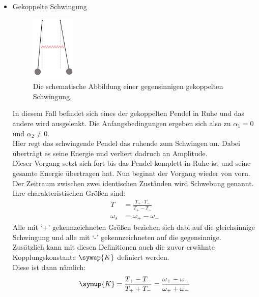 \begin{itemize}
    \item {\Large Gekoppelte Schwingung\\}{
        \begin{figure}[H]
            \centering
            \includegraphics[width=0.2\textwidth]{latex/images/schwing3.PNG}
            \caption{Die schematische Abbildung einer gegensinnigen gekoppelten Schwingung\protect \cite{V106}.}
            \label{img:3}
        \end{figure}
        \noindent In diesem Fall befindet sich eines der gekoppelten Pendel in Ruhe und das andere wird ausgelenkt.
        Die Anfangsbedingungen ergeben sich also zu $\alpha_1=0$ und $\alpha_2 \neq 0$.\\
        Hier regt das schwingende Pendel das ruhende zum Schwingen an. Dabei überträgt es seine Energie und verliert dadruch an Amplitude.\\
        Dieser Vorgang setzt sich fort bis das Pendel komplett in Ruhe ist und seine gesamte Energie übertragen hat. Nun beginnt der Vorgang wieder von vorn.\\
        Der Zeitraum zwischen zwei identischen Zuständen wird Schwebung genannt. Ihre charakteristischen Größen sind:
        \begin{align*}
            T&=\frac{T_+ \cdot T_-}{T_+ - T_-} \\
            \omega_s&= \omega_+ -\omega_-
        \end{align*} 
        Alle mit \enquote*{+} gekennzeichneten Größen beziehen sich dabi auf die gleichsinnige Schwingung und alle mit \enquote*{-} gekennzeichneten auf die gegensinnige.\\
        Zusätzlich kann mit diesen Definitionen auch die zuvor erwähnte Kopplungskonstante $\symup{K}$ definiert werden.\\
        Diese ist dann nämlich:
        \begin{equation*}
            \symup{K}=\frac{T_+ - T_-}{T_+ + T_-}=\frac{\omega_+ -\omega_-}{\omega_+ + \omega_-}
        \end{equation*}

        
        }
\end{itemize}




